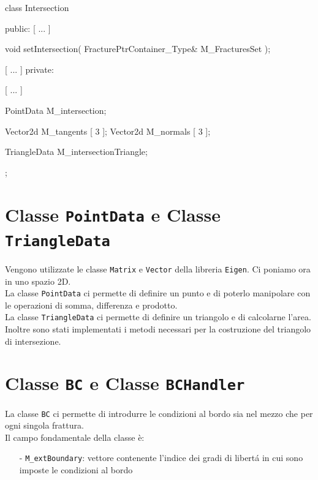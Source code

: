 \begin{Code03_03}[caption={Classe \texttt{Intersection}}]
class Intersection
{
 public:
	[ ... ]
	
	void setIntersection( FracturePtrContainer_Type& M_FracturesSet );
	
	[ ... ]
 private:
	
	[ ... ]	
	
	PointData M_intersection;
	
	Vector2d M_tangents [ 3 ];
	Vector2d M_normals [ 3 ];
	
	TriangleData M_intersectionTriangle;
};	
\end{Code03_03}

\section{Classe \texttt{PointData} e Classe \texttt{TriangleData}}

Vengono utilizzate le classe \texttt{Matrix} e \texttt{Vector} della libreria \texttt{Eigen}.
Ci poniamo ora in uno spazio 2D.\\
La classe \texttt{PointData} ci permette di definire un punto e di poterlo manipolare con le operazioni di somma, differenza e prodotto.\\
La classe \texttt{TriangleData} ci permette di definire un triangolo e di calcolarne l'area. Inoltre sono stati implementati i metodi necessari per la costruzione del triangolo di intersezione.


\section{Classe \texttt{BC} e Classe \texttt{BCHandler}}
La classe \texttt{BC} ci permette di introdurre le condizioni al bordo sia nel mezzo che per ogni singola frattura. \\ 
Il campo fondamentale della classe \`{e}:
	\begin{enumerate}
	\item[-] \texttt{M\_extBoundary}: vettore contenente l'indice dei gradi di libert\'{a} in cui sono imposte le condizioni al bordo
	\end{enumerate} 

